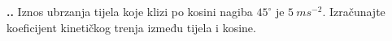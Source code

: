 

\noindent 
\textbf{
\thecjelina.\thezadatak.}
Iznos ubrzanja tijela koje klizi po kosini nagiba $45^\circ$ je $5\ ms^{-2}$. Izračunajte koeficijent kinetičkog trenja između tijela i kosine.